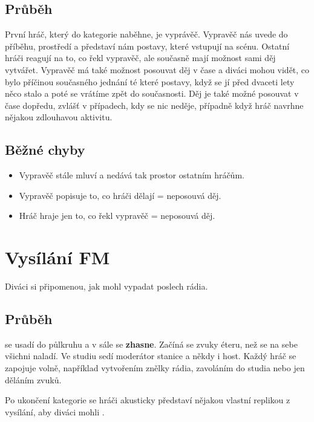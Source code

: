 \documentclass[main.tex]{subfiles}
\begin{document}
\subsection{ Průběh } První hráč, který do kategorie naběhne, je vyprávěč. Vypravěč nás uvede do příběhu, prostředí a představí nám postavy, které vstupují na scénu. Ostatní hráči reagují na to, co řekl vypravěč, ale současně mají možnost sami děj vytvářet. Vypravěč má také možnost posouvat děj v čase a diváci mohou vidět, co bylo příčinou současného jednání té které postavy, když se jí před dvaceti lety něco stalo a poté se vrátíme zpět do současnosti. Děj je také možné posouvat v čase dopředu, zvlášť v případech, kdy se nic neděje, případně když hráč navrhne nějakou zdlouhavou aktivitu. 
 
\subsection{ Běžné chyby } \begin{itemize}
\item Vypravěč stále mluví a nedává tak prostor ostatním hráčům.
\item Vypravěč popisuje to, co hráči dělají = neposouvá děj.
\item Hráč hraje jen to, co řekl vypravěč = neposouvá děj.
\end{itemize}
 
 
 
 
 
\needspace{5cm} \section{Vysílání FM} \label{vysílání fm}  
 
 
Diváci  si připomenou, jak mohl vypadat poslech rádia. 
 
 
\subsection{ Průběh }  se usadí do půlkruhu a v sále se \textbf{zhasne}{}. Začíná se zvuky éteru, než se na sebe všichni naladí. Ve studiu sedí moderátor stanice a někdy i host. Každý hráč se zapojuje volně, například vytvořením znělky rádia, zavoláním do studia nebo jen děláním zvuků. 
 
Po ukončení kategorie se hráči akusticky představí nějakou vlastní replikou z vysílání, aby diváci mohli . 
 
\end{document}
